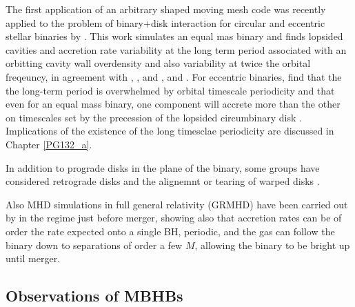 The first application of an arbitrary shaped moving mesh code \citep{AREPO} was recently applied to the problem of binary+disk interaction for circular and eccentric stellar binaries by \cite{MunozLai:2016}. This work simulates an equal mas binary and finds lopsided cavities and accretion rate variability at the long term period associated with an orbitting cavity wall overdensity and also variability at twice the orbital freqeuncy, in agreement with \cite{DHM:2013:MNRAS}, \cite{Farris:2014}, and \cite{ShiKrolik:2012}, and \cite{ShiKrolik:2015}. For eccentric binaries, \cite{MunozLai:2016} find that the the long-term period is overwhelmed by orbital timescale periodicity and that even for an equal mass binary, one component will accrete more than the other on timescales set by the precession of the lopsided circumbinary disk \citep[see also][]{Dunhill+2015}. Implications of the existence of the long timesclae periodicity are discussed in Chapter \ref{PG132_a}.



In addition to prograde disks in the plane of the binary, some groups have considered retrograde disks \citep{Nixon:2011:LongSim, RoedigSGmigrate:2014, DunhillNixon:2014, BankertShiKrolik:2015, NixonLubow:RetroRes:2015, AmaroSeoane:RetroDiscs:2016} and the alignemnt or tearing of warped disks \citep{NixonKingPringle:2011, Nixon:CntrAlign:2012, Hayasaki:misalignSims:2013, NixonKing:Tear:2013, DoganNixonKingPrice:2015}.

Also MHD simulations in full general relativity (GRMHD) have been carried out
by \cite{FarrisLiuShap:2010:Bondi, FarrisShap:2011, FarrisGold:2012,
Gold:GRMHD_CBD:2014, Gold:GRMHD_CBDII:2014} in the regime just before merger,
showing also that accretion rates can be of order the rate expected onto a
single BH, periodic, and the gas can follow the binary down to separations of
order a few $M$, allowing the binary to be bright up until merger.






\subsection{Observations of MBHBs}

